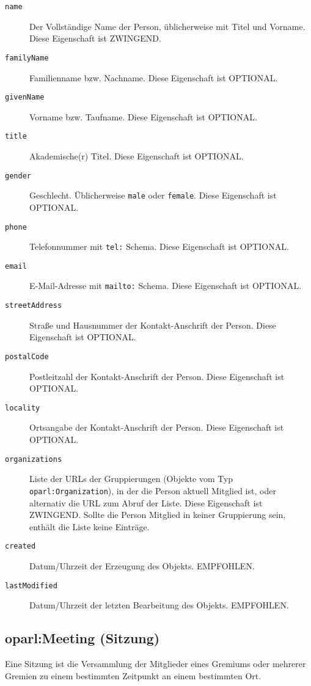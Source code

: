 \documentclass[,a4paper]{article}
\begin{document}
\begin{description}
\item[\texttt{name}]
Der Vollständige Name der Person, üblicherweise mit Titel und Vorname.
Diese Eigenschaft ist ZWINGEND.
\item[\texttt{familyName}]
Familienname bzw. Nachname. Diese Eigenschaft ist OPTIONAL.
\item[\texttt{givenName}]
Vorname bzw. Taufname. Diese Eigenschaft ist OPTIONAL.
\item[\texttt{title}]
Akademische(r) Titel. Diese Eigenschaft ist OPTIONAL.
\item[\texttt{gender}]
Geschlecht. Üblicherweise \texttt{male} oder \texttt{female}. Diese
Eigenschaft ist OPTIONAL.
\item[\texttt{phone}]
Telefonnummer mit \texttt{tel:} Schema. Diese Eigenschaft ist OPTIONAL.
\item[\texttt{email}]
E-Mail-Adresse mit \texttt{mailto:} Schema. Diese Eigenschaft ist
OPTIONAL.
\item[\texttt{streetAddress}]
Straße und Hausnummer der Kontakt-Anschrift der Person. Diese
Eigenschaft ist OPTIONAL.
\item[\texttt{postalCode}]
Postleitzahl der Kontakt-Anschrift der Person. Diese Eigenschaft ist
OPTIONAL.
\item[\texttt{locality}]
Ortsangabe der Kontakt-Anschrift der Person. Diese Eigenschaft ist
OPTIONAL.
\item[\texttt{organizations}]
Liste der URLs der Gruppierungen (Objekte vom Typ
\texttt{oparl:Organization}), in der die Person aktuell Mitglied ist,
oder alternativ die URL zum Abruf der Liste. Diese Eigenschaft ist
ZWINGEND. Sollte die Person Mitglied in keiner Gruppierung sein, enthält
die Liste keine Einträge.
\item[\texttt{created}]
Datum/Uhrzeit der Erzeugung des Objekts. EMPFOHLEN.
\item[\texttt{lastModified}]
Datum/Uhrzeit der letzten Bearbeitung des Objekts. EMPFOHLEN.
\end{description}

\subsection{oparl:Meeting (Sitzung)}\label{oparlux5fmeeting}

Eine Sitzung ist die Versammlung der Mitglieder eines Gremiums oder
mehrerer Gremien zu einem bestimmten Zeitpunkt an einem bestimmten Ort.
\end{document}
